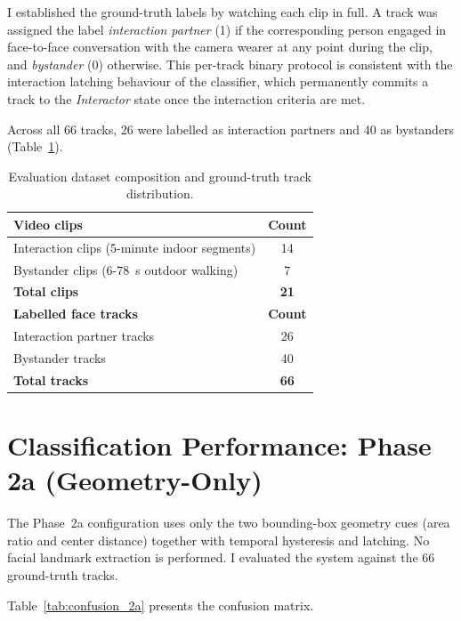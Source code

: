 I established the ground-truth labels by watching each clip in full. A track was assigned the label \emph{interaction partner} (1) if the
corresponding person engaged in face-to-face conversation with the camera wearer at
any point during the clip, and \emph{bystander} (0) otherwise. This per-track
binary protocol is consistent with the interaction latching behaviour of the classifier,
which permanently commits a track to the \emph{Interactor} state once the
interaction criteria are met.

Across all 66 tracks, 26 were labelled as interaction partners and 40 as bystanders
(Table~\ref{tab:dataset}).

\begin{table}[htbp]
\begin{singlespace}
\centering
\caption{Evaluation dataset composition and ground-truth track distribution.}
\label{tab:dataset}
\renewcommand{\arraystretch}{1.3}
\begin{tabular}{@{}lc@{}}
\toprule
\textbf{Video clips} & \textbf{Count} \\
\midrule
Interaction clips (5-minute indoor segments) & 14 \\
Bystander clips (6-78~s outdoor walking)    & 7  \\
\textbf{Total clips}                         & \textbf{21} \\
\midrule
\textbf{Labelled face tracks} & \textbf{Count} \\
\midrule
Interaction partner tracks & 26 \\
Bystander tracks           & 40 \\
\textbf{Total tracks}      & \textbf{66} \\
\bottomrule
\end{tabular}
\end{singlespace}
\end{table}

\section{Classification Performance: Phase 2a (Geometry-Only)}
\label{sec:results_2a}

The Phase~2a configuration uses only the two bounding-box geometry cues
(area ratio and center distance) together with temporal hysteresis and latching.
No facial landmark extraction is performed. I evaluated the system against the
66 ground-truth tracks.

Table~\ref{tab:confusion_2a} presents the confusion matrix.


